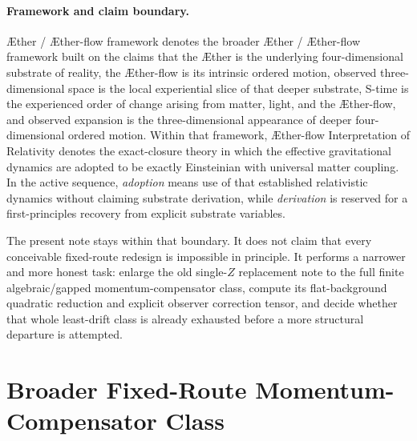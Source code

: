 \documentclass[11pt]{article}
\newcommand{\Aether}{\AE{}ther}
\newcommand{\Aflow}{\AE{}ther-flow}
\newcommand{\TheoryName}{\Aflow{} Interpretation of Relativity}
\newcommand{\TheoryProgram}{\Aether{} / \Aflow{} framework}
\begin{document}
\paragraph{Framework and claim boundary.}
\TheoryProgram{} denotes the broader \Aether{} / \Aflow{} framework built on the claims that the \Aether{} is the underlying four-dimensional substrate of reality, the \Aflow{} is its intrinsic ordered motion, observed three-dimensional space is the local experiential slice of that deeper substrate, S-time is the experienced order of change arising from matter, light, and the \Aflow{}, and observed expansion is the three-dimensional appearance of deeper four-dimensional ordered motion. Within that framework, \TheoryName{} denotes the exact-closure theory in which the effective gravitational dynamics are adopted to be exactly Einsteinian with universal matter coupling. In the active sequence, \emph{adoption} means use of that established relativistic dynamics without claiming substrate derivation, while \emph{derivation} is reserved for a first-principles recovery from explicit substrate variables.

The present note stays within that boundary. It does not claim that every conceivable fixed-route redesign is impossible in principle. It performs a narrower and more honest task: enlarge the old single-\(Z\) replacement note to the full finite algebraic/gapped momentum-compensator class, compute its flat-background quadratic reduction and explicit observer correction tensor, and decide whether that whole least-drift class is already exhausted before a more structural departure is attempted.

\section{Broader Fixed-Route Momentum-Compensator Class}
\end{document}
